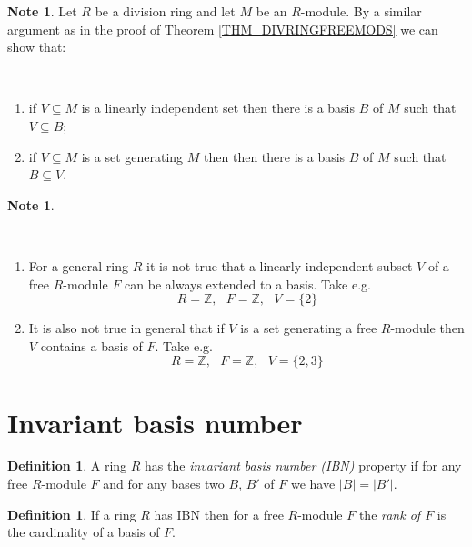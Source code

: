 \documentclass[12pt, letterpaper, oneside]{article}
\theoremstyle{plain}
\theoremstyle{definition}
\newtheorem{definition}[theorem]{Definition}
\newtheorem{note}[theorem]{Note}
\newcommand{\Z}{{\mathbb Z}}
\newcommand{\benu}{\begin{enumerate}}
\newcommand{\eenu}{\end{enumerate}}
\newcommand{\vs}{\vskip 5mm}
\begin{document}
 
 \vs\vs\vs
 
\begin{note}
Let $R$ be a division ring and let $M$ be an $R$-module. 
By a similar argument as in the proof of Theorem \ref{THM_DIVRINGFREEMODS}
we can show that:

\vskip -13mm

\ 
\benu
\item if $V\subseteq M$ is a linearly independent set then there is a basis $B$ of $M$
such that $V\subseteq B$;
\item if $V\subseteq M$ is a set generating $M$ then then there is a basis $B$ of $M$
such that $B\subseteq V$.
\eenu
\end{note}


\vs\vs\vs\vs\vs

\begin{note}\ 

\vskip -13mm

\ 

\benu
\item For a general ring $R$ it is not true that a linearly independent subset $V$ of a free $R$-module $F$
can be always extended to a basis. Take e.g. 
$$R= \Z, \ \ \ F = \Z, \ \ \ V= \{2\}$$ 

\item It is also not true in general that if $V$ is a set generating a free $R$-module then 
$V$ contains a basis of $F$. Take e.g. 
$$R= \Z, \ \ \ F = \Z, \ \ \ V= \{2, 3\}$$ 
\eenu 
\end{note} 
 
 



\newpage
\section{Invariant  basis number}
\label{SEC_IBNPROP} 

 \begin{definition}
 A ring $R$ has the \emph{invariant basis number (IBN)} property if for any free $R$-module $F$
 and for any bases two $B$, $B'$ of $F$ we have $|B| = |B'|$. 
 \end{definition}
 
 \vs\vs
 
 \begin{definition}
 If a ring $R$ has  IBN then for a free $R$-module $F$ the \emph{rank of $F$} is the cardinality 
 of a basis of $F$.  
 \end{definition}
 
\end{document}
